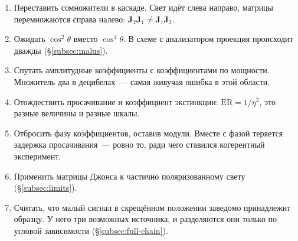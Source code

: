\begin{enumerate}[leftmargin=1.6em,itemsep=0.25em]
  \item Переставить сомножители в каскаде. Свет идёт слева направо, матрицы перемножаются справа
        налево: $\mathbf{J}_2\mathbf{J}_1\neq\mathbf{J}_1\mathbf{J}_2$.
  \item Ожидать $\cos^2\theta$ вместо $\cos^4\theta$. В схеме с анализатором проекция происходит
        дважды (§\ref{subsec:malus}).
  \item Спутать амплитудные коэффициенты с коэффициентами по мощности. Множитель два в
        децибелах~--- самая живучая ошибка в этой области.
  \item Отождествить просачивание и коэффициент экстинкции: $\mathrm{ER}=1/\eta^2$, это разные
        величины и разные шкалы.
  \item Отбросить фазу коэффициентов, оставив модули. Вместе с фазой теряется задержка
        просачивания~--- ровно то, ради чего ставился когерентный эксперимент.
  \item Применить матрицы Джонса к частично поляризованному свету (§\ref{subsec:limits}).
  \item Считать, что малый сигнал в скрещённом положении заведомо принадлежит образцу. У него
        три возможных источника, и разделяются они только по угловой зависимости
        (§\ref{subsec:full-chain}).
\end{enumerate}

\clearpage
